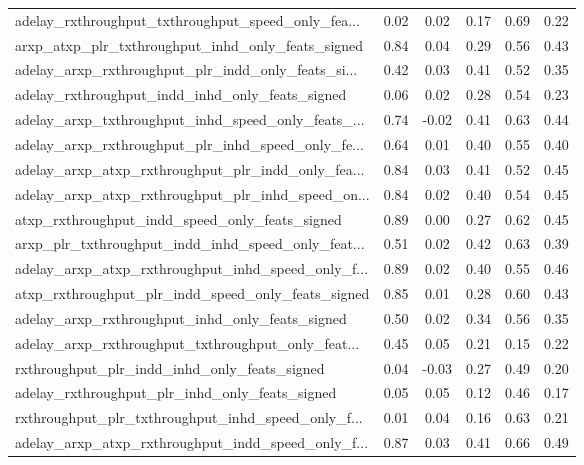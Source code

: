 \begin{tabular}{|l|*{4}{c}|r|}
adelay\_rxthroughput\_txthroughput\_speed\_only\_fea... & 0.02 &  0.02 &    0.17 &       0.69 &  0.22 \\
arxp\_atxp\_plr\_txthroughput\_inhd\_only\_feats\_signed  & 0.84 &  0.04 &    0.29 &       0.56 &  0.43 \\
adelay\_arxp\_rxthroughput\_plr\_indd\_only\_feats\_si... & 0.42 &  0.03 &    0.41 &       0.52 &  0.35 \\
adelay\_rxthroughput\_indd\_inhd\_only\_feats\_signed    & 0.06 &  0.02 &    0.28 &       0.54 &  0.23 \\
adelay\_arxp\_txthroughput\_inhd\_speed\_only\_feats\_... & 0.74 & -0.02 &    0.41 &       0.63 &  0.44 \\
adelay\_arxp\_rxthroughput\_plr\_inhd\_speed\_only\_fe... & 0.64 &  0.01 &    0.40 &       0.55 &  0.40 \\
adelay\_arxp\_atxp\_rxthroughput\_plr\_indd\_only\_fea... & 0.84 &  0.03 &    0.41 &       0.52 &  0.45 \\
adelay\_arxp\_atxp\_rxthroughput\_plr\_inhd\_speed\_on... & 0.84 &  0.02 &    0.40 &       0.54 &  0.45 \\
atxp\_rxthroughput\_indd\_speed\_only\_feats\_signed     & 0.89 &  0.00 &    0.27 &       0.62 &  0.45 \\
arxp\_plr\_txthroughput\_indd\_inhd\_speed\_only\_feat... & 0.51 &  0.02 &    0.42 &       0.63 &  0.39 \\
adelay\_arxp\_atxp\_rxthroughput\_inhd\_speed\_only\_f... & 0.89 &  0.02 &    0.40 &       0.55 &  0.46 \\
atxp\_rxthroughput\_plr\_indd\_speed\_only\_feats\_signed & 0.85 &  0.01 &    0.28 &       0.60 &  0.43 \\
adelay\_arxp\_rxthroughput\_inhd\_only\_feats\_signed    & 0.50 &  0.02 &    0.34 &       0.56 &  0.35 \\
adelay\_arxp\_rxthroughput\_txthroughput\_only\_feat... & 0.45 &  0.05 &    0.21 &       0.15 &  0.22 \\
rxthroughput\_plr\_indd\_inhd\_only\_feats\_signed       & 0.04 & -0.03 &    0.27 &       0.49 &  0.20 \\
adelay\_rxthroughput\_plr\_inhd\_only\_feats\_signed     & 0.05 &  0.05 &    0.12 &       0.46 &  0.17 \\
rxthroughput\_plr\_txthroughput\_inhd\_speed\_only\_f... & 0.01 &  0.04 &    0.16 &       0.63 &  0.21 \\
adelay\_arxp\_atxp\_rxthroughput\_indd\_speed\_only\_f... & 0.87 &  0.03 &    0.41 &       0.66 &  0.49 \\

\end{tabular}
